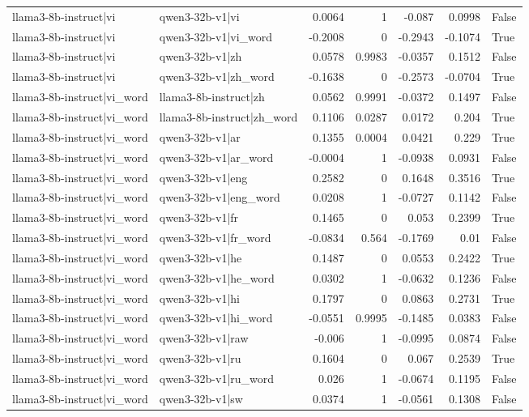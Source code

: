 \begin{table}
\begin{tabular}{l l r r r r l}
llama3-8b-instruct|vi & qwen3-32b-v1|vi & 0.0064 & 1 & -0.087 & 0.0998 & False \\
llama3-8b-instruct|vi & qwen3-32b-v1|vi_word & -0.2008 & 0 & -0.2943 & -0.1074 & True \\
llama3-8b-instruct|vi & qwen3-32b-v1|zh & 0.0578 & 0.9983 & -0.0357 & 0.1512 & False \\
llama3-8b-instruct|vi & qwen3-32b-v1|zh_word & -0.1638 & 0 & -0.2573 & -0.0704 & True \\
llama3-8b-instruct|vi_word & llama3-8b-instruct|zh & 0.0562 & 0.9991 & -0.0372 & 0.1497 & False \\
llama3-8b-instruct|vi_word & llama3-8b-instruct|zh_word & 0.1106 & 0.0287 & 0.0172 & 0.204 & True \\
llama3-8b-instruct|vi_word & qwen3-32b-v1|ar & 0.1355 & 0.0004 & 0.0421 & 0.229 & True \\
llama3-8b-instruct|vi_word & qwen3-32b-v1|ar_word & -0.0004 & 1 & -0.0938 & 0.0931 & False \\
llama3-8b-instruct|vi_word & qwen3-32b-v1|eng & 0.2582 & 0 & 0.1648 & 0.3516 & True \\
llama3-8b-instruct|vi_word & qwen3-32b-v1|eng_word & 0.0208 & 1 & -0.0727 & 0.1142 & False \\
llama3-8b-instruct|vi_word & qwen3-32b-v1|fr & 0.1465 & 0 & 0.053 & 0.2399 & True \\
llama3-8b-instruct|vi_word & qwen3-32b-v1|fr_word & -0.0834 & 0.564 & -0.1769 & 0.01 & False \\
llama3-8b-instruct|vi_word & qwen3-32b-v1|he & 0.1487 & 0 & 0.0553 & 0.2422 & True \\
llama3-8b-instruct|vi_word & qwen3-32b-v1|he_word & 0.0302 & 1 & -0.0632 & 0.1236 & False \\
llama3-8b-instruct|vi_word & qwen3-32b-v1|hi & 0.1797 & 0 & 0.0863 & 0.2731 & True \\
llama3-8b-instruct|vi_word & qwen3-32b-v1|hi_word & -0.0551 & 0.9995 & -0.1485 & 0.0383 & False \\
llama3-8b-instruct|vi_word & qwen3-32b-v1|raw & -0.006 & 1 & -0.0995 & 0.0874 & False \\
llama3-8b-instruct|vi_word & qwen3-32b-v1|ru & 0.1604 & 0 & 0.067 & 0.2539 & True \\
llama3-8b-instruct|vi_word & qwen3-32b-v1|ru_word & 0.026 & 1 & -0.0674 & 0.1195 & False \\
llama3-8b-instruct|vi_word & qwen3-32b-v1|sw & 0.0374 & 1 & -0.0561 & 0.1308 & False \\

\end{tabular}
\end{table}
